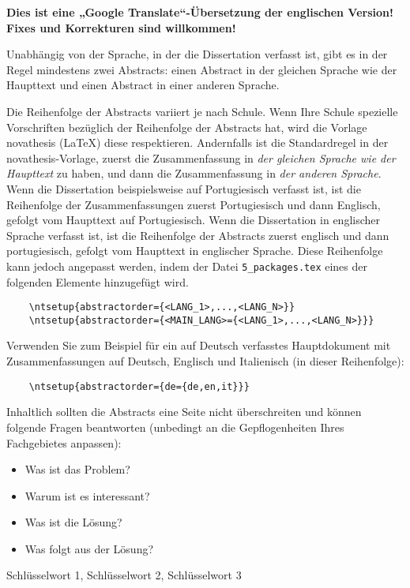 
%

\textbf{Dies ist eine „Google Translate“-Übersetzung der englischen Version! Fixes und Korrekturen sind willkommen!}

Unabhängig von der Sprache, in der die Dissertation verfasst ist, gibt es in der Regel mindestens zwei Abstracts: einen Abstract in der gleichen Sprache wie der Haupttext und einen Abstract in einer anderen Sprache.

Die Reihenfolge der Abstracts variiert je nach Schule. Wenn Ihre Schule spezielle Vorschriften bezüglich der Reihenfolge der Abstracts hat, wird die Vorlage \gls{novathesis} (\LaTeX) diese respektieren. Andernfalls ist die Standardregel in der \gls{novathesis}-Vorlage, zuerst die Zusammenfassung in \emph{der gleichen Sprache wie der Haupttext} zu haben, und dann die Zusammenfassung in \emph{der anderen Sprache}. Wenn die Dissertation beispielsweise auf Portugiesisch verfasst ist, ist die Reihenfolge der Zusammenfassungen zuerst Portugiesisch und dann Englisch, gefolgt vom Haupttext auf Portugiesisch. Wenn die Dissertation in englischer Sprache verfasst ist, ist die Reihenfolge der Abstracts zuerst englisch und dann portugiesisch, gefolgt vom Haupttext in englischer Sprache.
%
Diese Reihenfolge kann jedoch angepasst werden, indem der Datei \verb+5_packages.tex+ eines der folgenden Elemente hinzugefügt wird.

\begin{verbatim}
    \ntsetup{abstractorder={<LANG_1>,...,<LANG_N>}}
    \ntsetup{abstractorder={<MAIN_LANG>={<LANG_1>,...,<LANG_N>}}}
\end{verbatim}

Verwenden Sie zum Beispiel für ein auf Deutsch verfasstes Hauptdokument mit Zusammenfassungen auf Deutsch, Englisch und Italienisch (in dieser Reihenfolge):
\begin{verbatim}
    \ntsetup{abstractorder={de={de,en,it}}}
\end{verbatim}

Inhaltlich sollten die Abstracts eine Seite nicht überschreiten und können folgende Fragen beantworten (unbedingt an die Gepflogenheiten Ihres Fachgebietes anpassen):

\begin{itemize}
  \item Was ist das Problem?
  \item Warum ist es interessant?
  \item Was ist die Lösung?
  \item Was folgt aus der Lösung?
\end{itemize}

\begin{keywords}
Schlüsselwort 1, Schlüsselwort 2, Schlüsselwort 3
\end{keywords}
